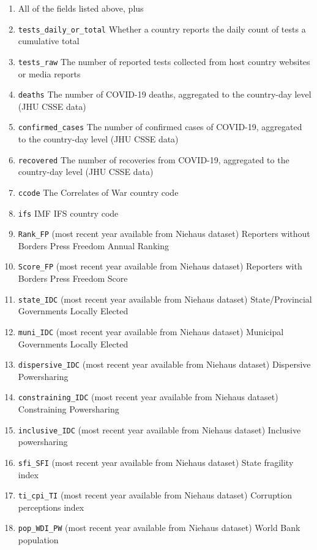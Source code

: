 \documentclass[
]{article}
\begin{document}
\begin{enumerate}
\def\labelenumi{\arabic{enumi}.}
\item
  All of the fields listed above, plus
\item
  \texttt{tests\_daily\_or\_total} Whether a country reports the daily count of tests a cumulative total
\item
  \texttt{tests\_raw} The number of reported tests collected from host country websites or media reports
\item
  \texttt{deaths} The number of COVID-19 deaths, aggregated to the country-day level (JHU CSSE data)
\item
  \texttt{confirmed\_cases} The number of confirmed cases of COVID-19, aggregated to the country-day level (JHU CSSE data)
\item
  \texttt{recovered} The number of recoveries from COVID-19, aggregated to the country-day level (JHU CSSE data)
\item
  \texttt{ccode} The Correlates of War country code
\item
  \texttt{ifs} IMF IFS country code
\item
  \texttt{Rank\_FP} (most recent year available from Niehaus dataset) Reporters without Borders Press Freedom Annual Ranking
\item
  \texttt{Score\_FP} (most recent year available from Niehaus dataset) Reporters with Borders Press Freedom Score
\item
  \texttt{state\_IDC} (most recent year available from Niehaus dataset) State/Provincial Governments Locally Elected
\item
  \texttt{muni\_IDC} (most recent year available from Niehaus dataset) Municipal Governments Locally Elected
\item
  \texttt{dispersive\_IDC} (most recent year available from Niehaus dataset) Dispersive Powersharing
\item
  \texttt{constraining\_IDC} (most recent year available from Niehaus dataset) Constraining Powersharing
\item
  \texttt{inclusive\_IDC} (most recent year available from Niehaus dataset) Inclusive powersharing
\item
  \texttt{sfi\_SFI} (most recent year available from Niehaus dataset) State fragility index
\item
  \texttt{ti\_cpi\_TI} (most recent year available from Niehaus dataset) Corruption perceptions index
\item
  \texttt{pop\_WDI\_PW} (most recent year available from Niehaus dataset) World Bank population

\end{enumerate}
\end{document}

